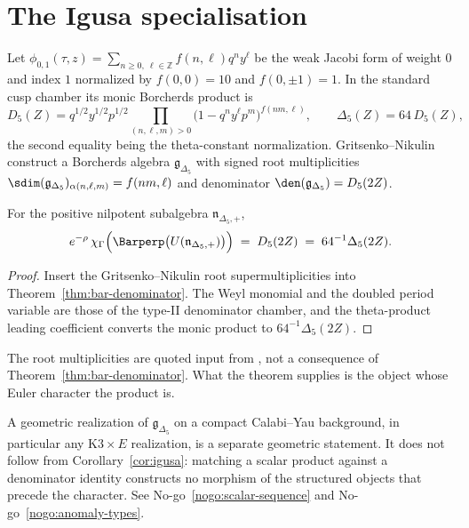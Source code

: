 \section{The Igusa specialisation}

Let $\phi_{0,1}(\tau,z)=\sum_{n\ge0,\ \ell\in\mathbb
Z}f(n,\ell)q^ny^\ell$ be the weak Jacobi form of weight $0$ and index $1$
normalized by $f(0,0)=10$ and $f(0,\pm1)=1$. In the standard cusp chamber
its monic Borcherds product is
\[
  D_5(Z) = q^{1/2}y^{1/2}p^{1/2}
  \prod_{(n,\ell,m)>0}\bigl(1-q^ny^\ell p^m\bigr)^{f(nm,\ell)},
  \qquad \Delta_5(Z) = 64\,D_5(Z),
\]
the second equality being the theta-constant normalization.
Gritsenko--Nikulin \cite{GN97} construct a Borcherds algebra
$\mathfrak g_{\Delta_5}$ with signed root multiplicities
$\sdim(\mathfrak g_{\Delta_5})_{\alpha(n,\ell,m)}=f(nm,\ell)$ and
denominator $\den(\mathfrak g_{\Delta_5})=D_5(2Z)$.

\begin{corollary}
\label{cor:igusa}
\StatusProved{} For the positive nilpotent subalgebra $\mathfrak
n_{\Delta_5,+}$,
\[
  e^{-\rho}\,
  \chi_\Gamma\Bigl(\Barperp\bigl(U(\mathfrak n_{\Delta_5,+})\bigr)\Bigr)
  \;=\; D_5(2Z) \;=\; 64^{-1}\Delta_5(2Z).
\]
\end{corollary}

\begin{proof}
Insert the Gritsenko--Nikulin root supermultiplicities into
Theorem~\ref{thm:bar-denominator}. The Weyl monomial and the doubled
period variable are those of the type-II denominator chamber, and the
theta-product leading coefficient converts the monic product to
$64^{-1}\Delta_5(2Z)$.
\end{proof}

The root multiplicities are quoted input from \cite{GN97}, not a
consequence of Theorem~\ref{thm:bar-denominator}. What the theorem
supplies is the object whose Euler character the product is.

\begin{remark}
\label{rem:k3e}
A geometric realization of $\mathfrak g_{\Delta_5}$ on a compact
Calabi--Yau background, in particular any $\mathrm{K3}\times E$
realization, is a separate geometric statement. It does not follow from
Corollary~\ref{cor:igusa}: matching a scalar product against a
denominator identity constructs no morphism of the structured objects that
precede the character. See No-go~\ref{nogo:scalar-sequence} and
No-go~\ref{nogo:anomaly-types}.
\end{remark}
